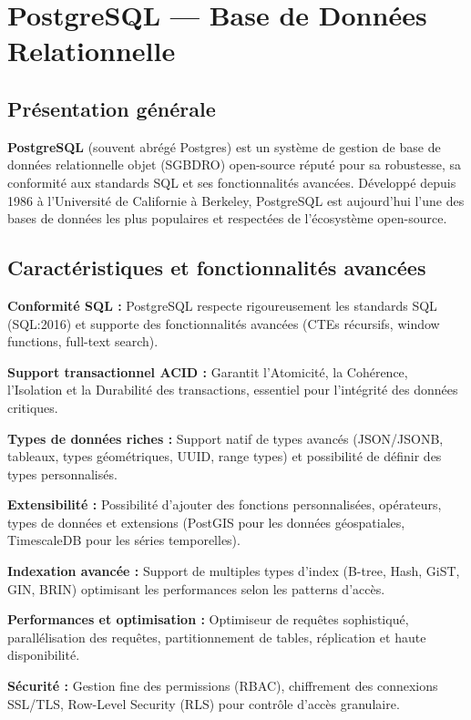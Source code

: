 \section{PostgreSQL — Base de Données Relationnelle}

\subsection{Présentation générale}

\textbf{PostgreSQL} (souvent abrégé Postgres) est un système de gestion de base de données relationnelle objet (SGBDRO) open-source réputé pour sa robustesse, sa conformité aux standards SQL et ses fonctionnalités avancées. Développé depuis 1986 à l'Université de Californie à Berkeley, PostgreSQL est aujourd'hui l'une des bases de données les plus populaires et respectées de l'écosystème open-source.


\subsection{Caractéristiques et fonctionnalités avancées}

\textbf{Conformité SQL :} PostgreSQL respecte rigoureusement les standards SQL (SQL:2016) et supporte des fonctionnalités avancées (CTEs récursifs, window functions, full-text search).

\textbf{Support transactionnel ACID :} Garantit l'Atomicité, la Cohérence, l'Isolation et la Durabilité des transactions, essentiel pour l'intégrité des données critiques.

\textbf{Types de données riches :} Support natif de types avancés (JSON/JSONB, tableaux, types géométriques, UUID, range types) et possibilité de définir des types personnalisés.

\textbf{Extensibilité :} Possibilité d'ajouter des fonctions personnalisées, opérateurs, types de données et extensions (PostGIS pour les données géospatiales, TimescaleDB pour les séries temporelles).

\textbf{Indexation avancée :} Support de multiples types d'index (B-tree, Hash, GiST, GIN, BRIN) optimisant les performances selon les patterns d'accès.

\textbf{Performances et optimisation :} Optimiseur de requêtes sophistiqué, parallélisation des requêtes, partitionnement de tables, réplication et haute disponibilité.

\textbf{Sécurité :} Gestion fine des permissions (RBAC), chiffrement des connexions SSL/TLS, Row-Level Security (RLS) pour contrôle d'accès granulaire.

